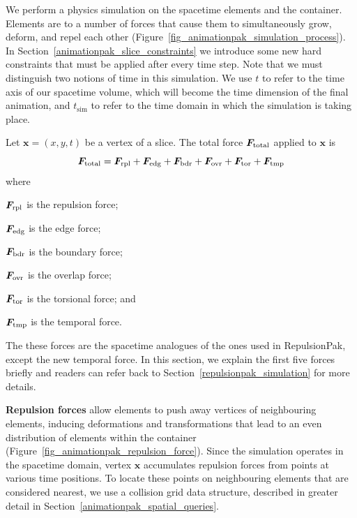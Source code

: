 \newtext
{
We perform a physics simulation on the spacetime elements and the 
container.  Elements are  to a number of forces that cause them
to simultaneously grow, deform, and repel each other (Figure~\ref{fig_animationpak_simulation_process}).
In Section~\ref{animationpak_slice_constraints} we introduce some new hard
constraints that must be applied after every time step.
Note that we must distinguish two notions of time in this simulation.  We use
$t$ to refer to the time axis of our spacetime volume, which will become
the time dimension of the final animation, and $t_\mathrm{sim}$ to
refer to the time domain in which the simulation is taking place.
}

\newtext
{
Let $\bm{x} = (x, y, t)$ be a vertex of a slice.
The total force $\bm{F}_\mathrm{total} $ applied to $\bm{x}$ is
\begin{equation}
\bm{F}_\mathrm{total}  = \bm{F}_\mathrm{rpl} + \bm{F}_\mathrm{edg} + \bm{F}_\mathrm{bdr} + \bm{F}_\mathrm{ovr} + \bm{F}_\mathrm{tor} + \bm{F}_\mathrm{tmp}
\end{equation}
where 
\begin{packeddescriptions}
  \item[$\bm{F}_\mathrm{rpl}$] is the repulsion force;
  \item[$\bm{F}_\mathrm{edg}$] is the edge force;
  \item[$\bm{F}_\mathrm{bdr}$] is the boundary force;
  \item[$\bm{F}_\mathrm{ovr}$] is the overlap force;
  \item[$\bm{F}_\mathrm{tor}$] is the torsional force; and 
  \item[$\bm{F}_\mathrm{tmp}$] is the temporal force.  
\end{packeddescriptions}
The these forces are the spacetime analogues of the ones used in RepulsionPak, except the new temporal force.
In this section, we explain the first five forces briefly 
and readers can refer back to Section~\ref{repulsionpak_simulation}
for more details.
}



\newtext
{
\textbf{Repulsion forces} allow elements to push away vertices of 
neighbouring elements, inducing deformations and transformations that lead 
to an even distribution of elements within the container
(Figure~\ref{fig_animationpak_repulsion_force}).
Since the simulation operates in the spacetime domain,
vertex $\bm{x}$ accumulates repulsion forces from points at
various time positions.
To locate these points on neighbouring elements that are considered 
nearest, we use a collision grid data structure, described in greater
detail in Section~\ref{animationpak_spatial_queries}.
}

